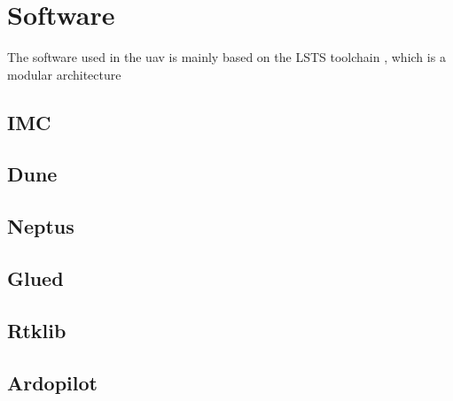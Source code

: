 \chapter{Software}
The software used in the uav is mainly based on the LSTS toolchain \citep{pinto2013lsts}, which is a modular architecture
\section{IMC}
\section{Dune}
\section{Neptus}
\section{Glued}
\section{Rtklib}
\section{Ardopilot}